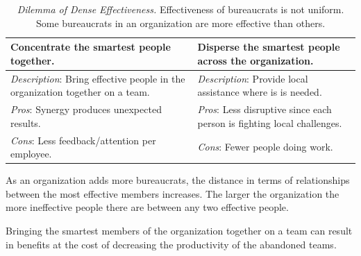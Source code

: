 \begin{center}
\begin{table}[H] %
\begin{tabular}{ | m{\dilemmatablewidth}| m{\dilemmatablewidth} | } 
  \hline
  \textbf{Concentrate the smartest people together.} &
  \textbf{Disperse the smartest people across the organization.} \\ 
  \hline
  \textit{Description}: Bring effective people in the organization together on a team. & 
  \textit{Description}: Provide local assistance where is is needed. \\ 
  \hline
  \textit{Pros}: Synergy produces unexpected results. & 
  \textit{Pros}: Less disruptive since each person is fighting local challenges. \\  
  \hline
  \textit{Cons}: Less feedback/attention per employee. & 
  \textit{Cons}: Fewer people doing work. \\  
  \hline
\end{tabular}
\caption{
\textit{Dilemma of Dense Effectiveness.}
Effectiveness of bureaucrats is not uniform. Some bureaucrats in an organization are more effective than others.
}
\label{table:dilemma-org-dense-effectiveness}
\end{table}
\end{center}


As an organization adds more bureaucrats, the distance in terms of relationships between the most effective members increases.
The larger the organization the more ineffective people there are between any two effective people. 

Bringing the smartest members of the organization together on a team can result in benefits at the cost of decreasing the productivity of the abandoned teams. 


